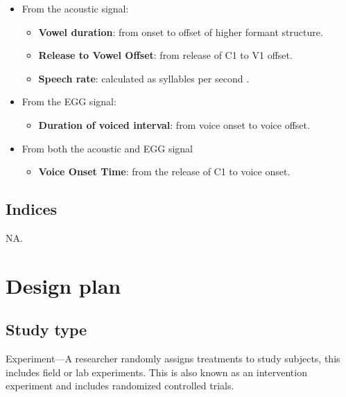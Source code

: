\documentclass[11pt,]{article}
\providecommand{\tightlist}{%
  \setlength{\itemsep}{0pt}\setlength{\parskip}{0pt}}
\begin{document}
\begin{itemize}
\tightlist
\item
  From the acoustic signal:

  \begin{itemize}
  \tightlist
  \item
    \textbf{Vowel duration}: from onset to offset of higher formant
    structure.
  \item
    \textbf{Release to Vowel Offset}: from release of C1 to V1 offset.
  \item
    \textbf{Speech rate}: calculated as syllables per second
    \citep[\texttt{n\ of\ syllables\ /\ sentence\ duration},][]{plug2018}.
  \end{itemize}
\item
  From the EGG signal:

  \begin{itemize}
  \tightlist
  \item
    \textbf{Duration of voiced interval}: from voice onset to voice
    offset.
  \end{itemize}
\item
  From both the acoustic and EGG signal

  \begin{itemize}
  \tightlist
  \item
    \textbf{Voice Onset Time}: from the release of C1 to voice onset.
  \end{itemize}
\end{itemize}

\hypertarget{indices}{%
\subsection{Indices}\label{indices}}

NA.

\hypertarget{design-plan}{%
\section{Design plan}\label{design-plan}}

\hypertarget{study-type}{%
\subsection{Study type}\label{study-type}}

Experiment---A researcher randomly assigns treatments to study subjects,
this includes field or lab experiments. This is also known as an
intervention experiment and includes randomized controlled trials.
\end{document}
